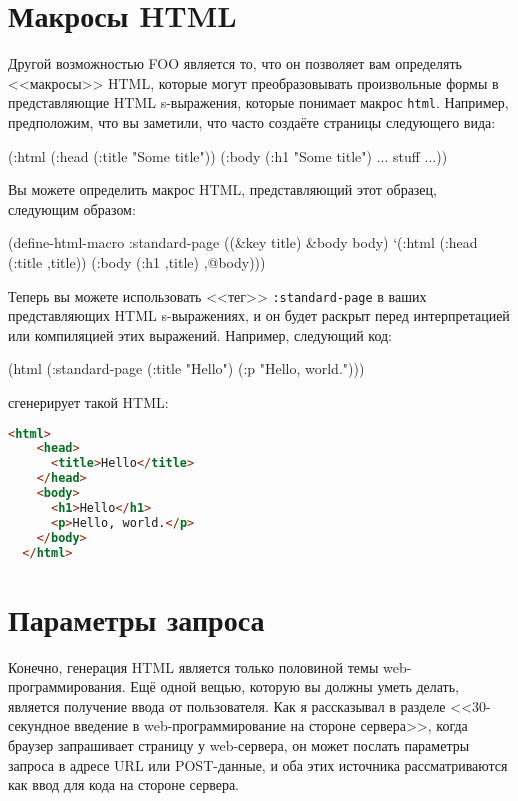 \section{Макросы HTML}

Другой возможностью FOO является то, что он позволяет вам определять <<макросы>>
HTML, которые могут преобразовывать произвольные формы в представляющие HTML s-выражения,
которые понимает макрос \lstinline{html}. Например, предположим, что вы заметили, что часто
создаёте страницы следующего вида:

\begin{myverb}
  (:html
    (:head (:title "Some title"))
    (:body
      (:h1 "Some title")
      ... stuff ...))
\end{myverb}

Вы можете определить макрос HTML, представляющий этот образец, следующим образом:

\begin{myverb}
  (define-html-macro :standard-page ((&key title) &body body)
    `(:html
       (:head (:title ,title))
       (:body
        (:h1 ,title)
        ,@body)))
\end{myverb}

Теперь вы можете использовать <<тег>> \lstinline{:standard-page} в ваших представляющих HTML
s-выражениях, и он будет раскрыт перед интерпретацией или компиляцией этих выражений.
Например, следующий код:

\begin{myverb}
  (html (:standard-page (:title "Hello") (:p "Hello, world.")))
\end{myverb}

\noindent{}сгенерирует такой HTML:

\begin{lstlisting}[language=HTML]
  <html>
    <head>
      <title>Hello</title>
    </head>
    <body>
      <h1>Hello</h1>
      <p>Hello, world.</p>
    </body>
  </html>
\end{lstlisting}

\section{Параметры запроса}

Конечно, генерация HTML является только половиной темы web-программирования. Ещё одной
вещью, которую вы должны уметь делать, является получение ввода от пользователя. Как я
рассказывал в разделе <<30-секундное введение в web-программирование на стороне сервера>>,
когда браузер запрашивает страницу у web-сервера, он может послать параметры запроса в
адресе URL или POST-данные, и оба этих источника рассматриваются как ввод для кода на
стороне сервера.

